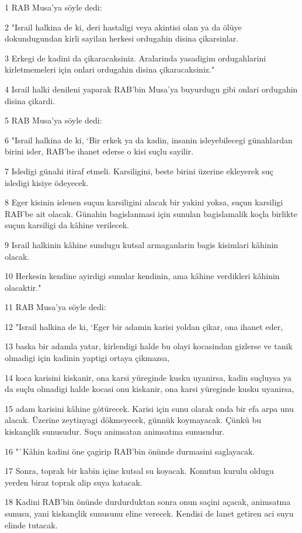 \par 1 RAB Musa'ya söyle dedi:
\par 2 "Israil halkina de ki, deri hastaligi veya akintisi olan ya da ölüye dokundugundan kirli sayilan herkesi ordugahin disina çikarsinlar.
\par 3 Erkegi de kadini da çikaracaksiniz. Aralarinda yasadigim ordugahlarini kirletmemeleri için onlari ordugahin disina çikaracaksiniz."
\par 4 Israil halki denileni yaparak RAB'bin Musa'ya buyurdugu gibi onlari ordugahin disina çikardi.
\par 5 RAB Musa'ya söyle dedi:
\par 6 "Israil halkina de ki, `Bir erkek ya da kadin, insanin isleyebilecegi günahlardan birini isler, RAB'be ihanet ederse o kisi suçlu sayilir.
\par 7 Isledigi günahi itiraf etmeli. Karsiligini, beste birini üzerine ekleyerek suç isledigi kisiye ödeyecek.
\par 8 Eger kisinin islenen suçun karsiligini alacak bir yakini yoksa, suçun karsiligi RAB'be ait olacak. Günahin bagislanmasi için sunulan bagislamalik koçla birlikte suçun karsiligi da kâhine verilecek.
\par 9 Israil halkinin kâhine sundugu kutsal armaganlarin bagis kisimlari kâhinin olacak.
\par 10 Herkesin kendine ayirdigi sunular kendinin, ama kâhine verdikleri kâhinin olacaktir."
\par 11 RAB Musa'ya söyle dedi:
\par 12 "Israil halkina de ki, `Eger bir adamin karisi yoldan çikar, ona ihanet eder,
\par 13 baska bir adamla yatar, kirlendigi halde bu olayi kocasindan gizlerse ve tanik olmadigi için kadinin yaptigi ortaya çikmazsa,
\par 14 koca karisini kiskanir, ona karsi yüreginde kusku uyanirsa, kadin suçluysa ya da suçlu olmadigi halde kocasi onu kiskanir, ona karsi yüreginde kusku uyanirsa,
\par 15 adam karisini kâhine götürecek. Karisi için sunu olarak onda bir efa arpa unu alacak. Üzerine zeytinyagi dökmeyecek, günnük koymayacak. Çünkü bu kiskançlik sunusudur. Suçu animsatan animsatma sunusudur.
\par 16 "`Kâhin kadini öne çagirip RAB'bin önünde durmasini saglayacak.
\par 17 Sonra, toprak bir kabin içine kutsal su koyacak. Konutun kurulu oldugu yerden biraz toprak alip suya katacak.
\par 18 Kadini RAB'bin önünde durdurduktan sonra onun saçini açacak, animsatma sunusu, yani kiskançlik sunusunu eline verecek. Kendisi de lanet getiren aci suyu elinde tutacak.
